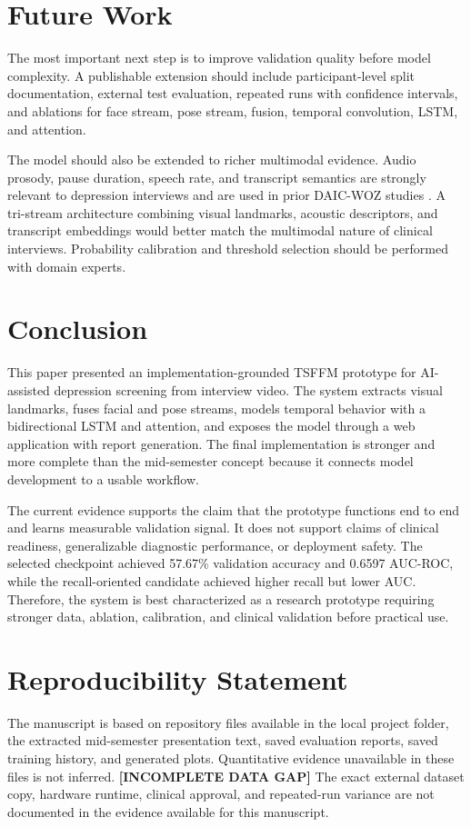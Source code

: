 \documentclass[conference]{IEEEtran}
\newcommand{\gap}{\textbf{[INCOMPLETE DATA GAP]}}
\begin{document}
\section{Future Work}
The most important next step is to improve validation quality before model complexity. A publishable extension should include participant-level split documentation, external test evaluation, repeated runs with confidence intervals, and ablations for face stream, pose stream, fusion, temporal convolution, LSTM, and attention.

The model should also be extended to richer multimodal evidence. Audio prosody, pause duration, speech rate, and transcript semantics are strongly relevant to depression interviews and are used in prior DAIC-WOZ studies \cite{zhang_multimodal}. A tri-stream architecture combining visual landmarks, acoustic descriptors, and transcript embeddings would better match the multimodal nature of clinical interviews. Probability calibration and threshold selection should be performed with domain experts.

\section{Conclusion}
This paper presented an implementation-grounded TSFFM prototype for AI-assisted depression screening from interview video. The system extracts visual landmarks, fuses facial and pose streams, models temporal behavior with a bidirectional LSTM and attention, and exposes the model through a web application with report generation. The final implementation is stronger and more complete than the mid-semester concept because it connects model development to a usable workflow.

The current evidence supports the claim that the prototype functions end to end and learns measurable validation signal. It does not support claims of clinical readiness, generalizable diagnostic performance, or deployment safety. The selected checkpoint achieved 57.67\% validation accuracy and 0.6597 AUC-ROC, while the recall-oriented candidate achieved higher recall but lower AUC. Therefore, the system is best characterized as a research prototype requiring stronger data, ablation, calibration, and clinical validation before practical use.

\section*{Reproducibility Statement}
The manuscript is based on repository files available in the local project folder, the extracted mid-semester presentation text, saved evaluation reports, saved training history, and generated plots. Quantitative evidence unavailable in these files is not inferred. \gap{} The exact external dataset copy, hardware runtime, clinical approval, and repeated-run variance are not documented in the evidence available for this manuscript.
\end{document}
